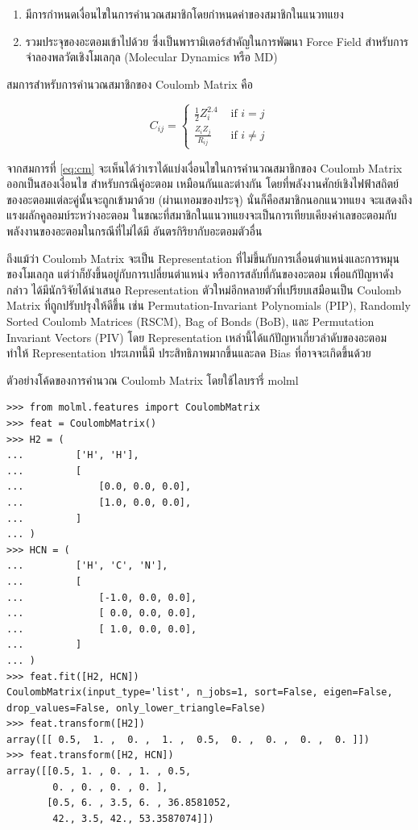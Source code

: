 \begin{enumerate}
    \item มีการกำหนดเงื่อนไขในการคำนวณสมาชิกโดยกำหนดค่าของสมาชิกในแนวทแยง
    
    \item รวมประจุของอะตอมเข้าไปด้วย ซึ่งเป็นพารามิเตอร์สำคัญในการพัฒนา Force Field สำหรับการจำลองพลวัตเชิงโมเลกุล (Molecular 
    Dynamics หรือ MD)
\end{enumerate}

สมการสำหรับการคำนวณสมาชิกของ Coulomb Matrix คือ

\begin{equation}\label{eq:cm}
    C_{ij} =
    \begin{cases}
    \frac{1}{2} Z_i^{2.4} & \text{ if } i = j \\ 
    \frac{Z_i Z_j}{R_{ij}} & \text{ if } i \neq j
    \end{cases}
\end{equation}

จากสมการที่ \ref{eq:cm} จะเห็นได้ว่าเราได้แบ่งเงื่อนไขในการคำนวณสมาชิกของ Coulomb Matrix ออกเป็นสองเงื่อนไข สำหรับกรณีคู่อะตอม%
เหมือนกันและต่างกัน โดยที่พลังงานศักย์เชิงไฟฟ้าสถิตย์ของอะตอมแต่ละคู่นั้นจะถูกเข้ามาด้วย (ผ่านเทอมของประจุ) นั่นก็คือสมาชิกนอกแนวทแยง%
จะแสดงถึงแรงผลักคูลอมบ์ระหว่างอะตอม ในขณะที่สมาชิกในแนวทแยงจะเป็นการเทียบเคียงค่าเลขอะตอมกับพลังงานของอะตอมในกรณีที่ไม่ได้มี%
อันตรกิริยากับอะตอมตัวอื่น

ถึงแม้ว่า Coulomb Matrix จะเป็น Representation ที่ไม่ขึ้นกับการเลื่อนตำแหน่งและการหมุนของโมเลกุล แต่ว่าก็ยังขึ้นอยู่กับการเปลี่ยนตำแหน่ง%
หรือการสลับที่กันของอะตอม เพื่อแก้ปัญหาดังกล่าว ได้มีนักวิจัยได้นำเสนอ Representation ตัวใหม่อีกหลายตัวที่เปรียบเสมือนเป็น Coulomb Matrix 
ที่ถูกปรับปรุงให้ดีขึ้น เช่น Permutation-Invariant Polynomials (PIP)\autocite{braams2009}, Randomly Sorted Coulomb Matrices 
(RSCM)\autocite{hansen2013}, Bag of Bonds (BoB)\autocite{hansen2013}, และ Permutation Invariant Vectors 
(PIV)\autocite{gallet2013} โดย Representation เหล่านี้ได้แก้ปัญหาเกี่ยวลำดับของอะตอม ทำให้ Representation ประเภทนี้มี%
ประสิทธิภาพมากขึ้นและลด Bias ที่อาจจะเกิดขึ้นด้วย

ตัวอย่างโค้ดของการคำนวณ Coulomb Matrix โดยใช้ไลบรารี่ molml\autocite{collins2018}

\begin{lstlisting}[style=MyPython]
>>> from molml.features import CoulombMatrix
>>> feat = CoulombMatrix()
>>> H2 = (
...         ['H', 'H'],
...         [
...             [0.0, 0.0, 0.0],
...             [1.0, 0.0, 0.0],
...         ]
... )
>>> HCN = (
...         ['H', 'C', 'N'],
...         [
...             [-1.0, 0.0, 0.0],
...             [ 0.0, 0.0, 0.0],
...             [ 1.0, 0.0, 0.0],
...         ]
... )
>>> feat.fit([H2, HCN])
CoulombMatrix(input_type='list', n_jobs=1, sort=False, eigen=False, drop_values=False, only_lower_triangle=False)
>>> feat.transform([H2])
array([[ 0.5,  1. ,  0. ,  1. ,  0.5,  0. ,  0. ,  0. ,  0. ]])
>>> feat.transform([H2, HCN])
array([[0.5, 1. , 0. , 1. , 0.5,
        0. , 0. , 0. , 0. ],
       [0.5, 6. , 3.5, 6. , 36.8581052,
        42., 3.5, 42., 53.3587074]])
\end{lstlisting}

